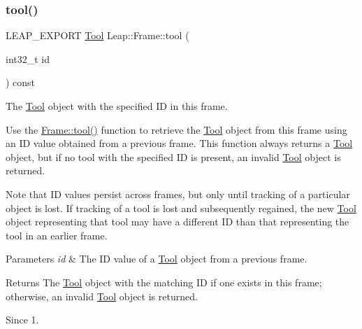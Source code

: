 \subsubsection{\texorpdfstring{tool()}{tool()}}
{\footnotesize\ttfamily L\+E\+A\+P\+\_\+\+E\+X\+P\+O\+RT \hyperlink{class_leap_1_1_tool}{Tool} Leap\+::\+Frame\+::tool (\begin{DoxyParamCaption}\item[{int32\+\_\+t}]{id }\end{DoxyParamCaption}) const}

The \hyperlink{class_leap_1_1_tool}{Tool} object with the specified ID in this frame.

Use the \hyperlink{class_leap_1_1_frame_a161325a08290ab7aec4d335f1a169ad3}{Frame\+::tool()} function to retrieve the \hyperlink{class_leap_1_1_tool}{Tool} object from this frame using an ID value obtained from a previous frame. This function always returns a \hyperlink{class_leap_1_1_tool}{Tool} object, but if no tool with the specified ID is present, an invalid \hyperlink{class_leap_1_1_tool}{Tool} object is returned.


\begin{DoxyCodeInclude}
\end{DoxyCodeInclude}


Note that ID values persist across frames, but only until tracking of a particular object is lost. If tracking of a tool is lost and subsequently regained, the new \hyperlink{class_leap_1_1_tool}{Tool} object representing that tool may have a different ID than that representing the tool in an earlier frame.


\begin{DoxyParams}{Parameters}
{\em id} & The ID value of a \hyperlink{class_leap_1_1_tool}{Tool} object from a previous frame. \\
\hline
\end{DoxyParams}
\begin{DoxyReturn}{Returns}
The \hyperlink{class_leap_1_1_tool}{Tool} object with the matching ID if one exists in this frame; otherwise, an invalid \hyperlink{class_leap_1_1_tool}{Tool} object is returned. 
\end{DoxyReturn}
\begin{DoxySince}{Since}
1. 
\end{DoxySince}
\mbox{\label{class_leap_1_1_frame_a22ade80385331bef910b3bff3abd121c}} 
